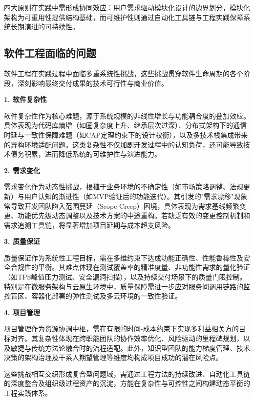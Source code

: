 四大原则在实践中需形成协同效应：用户需求驱动模块化设计的边界划分，模块化架构为可重用性提供结构基础，而可维护性则通过自动化工具链与工程实践保障系统长期演进的可持续性。

\subsection{软件工程面临的问题}

软件工程在实践过程中面临多重系统性挑战，这些挑战贯穿软件生命周期的各个阶段，深刻影响最终交付成果的技术可行性与商业价值。

\textbf{1. 软件复杂性}

软件复杂性作为核心难题，源于系统规模的非线性增长与功能耦合度的叠加效应。具体表现为代码库熵增（如圈复杂度上升、继承层次过深）、分布式架构下的通信时延与一致性保障难题（如CAP定理约束下的设计权衡），以及多技术栈集成带来的异构环境适配问题。这类复杂性不仅加剧开发过程中的认知负荷，还可能导致技术债务积累，进而降低系统的可维护性与演进能力。

\textbf{2. 需求变化}

需求变化作为动态性挑战，根植于业务环境的不确定性（如市场策略调整、法规更新）与用户认知的渐进性（如MVP验证后的功能迭代）。其引发的"需求漂移"现象常导致开发团队陷入范围蔓延（Scope Creep）困境，具体表现为需求基线频繁变更、功能优先级动态调整以及技术方案的中途重构。若缺乏有效的变更控制机制和需求追溯工具链，将显著增加项目延期与成本超支风险。

\textbf{3. 质量保证}

质量保证作为系统性工程目标，需在多维约束下达成功能正确性、性能鲁棒性及安全合规性的平衡。其难点体现在测试覆盖率的精准度量、非功能性需求的量化验证（如TPS峰值压力测试、安全漏洞扫描），以及持续交付场景下的质量门限控制。特别是在微服务架构与云原生环境中，质量保障需进一步应对服务间调用链路的监控盲区、容器化部署的弹性测试及多云环境的一致性验证。

\textbf{4. 项目管理}

项目管理作为资源协调中枢，需在有限的时间-成本约束下实现多利益相关方的目标对齐。其复杂性体现在跨职能团队的协作效率优化、风险驱动的里程碑规划，以及敏捷与传统方法论融合时的流程适配。此外，知识型团队的能力梯度管理、技术决策的架构治理及干系人期望管理等维度均构成项目成功的潜在风险点。

这些挑战相互交织形成复合型问题域，需通过工程方法的持续改进、自动化工具链的深度整合及组织级过程资产的沉淀，方能在复杂性与可控性之间构建动态平衡的工程实践体系。

